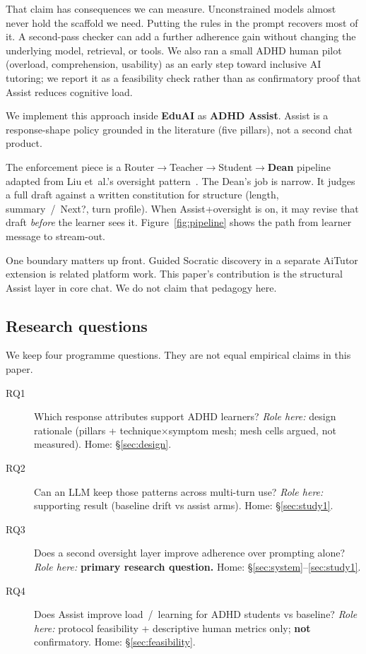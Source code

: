 That claim has consequences we can measure. Unconstrained models almost never
hold the scaffold we need. Putting the rules in the prompt recovers most of
it. A second-pass checker can add a further adherence gain without changing
the underlying model, retrieval, or tools. We also ran a small ADHD human
pilot (overload, comprehension, usability) as an early step toward inclusive
AI tutoring; we report it as a feasibility check rather than as confirmatory
proof that Assist reduces cognitive load.

We implement this approach inside \textbf{EduAI} as \textbf{ADHD Assist}.
Assist is a response-shape policy grounded in the literature (five pillars),
not a second chat product.

The enforcement piece is a Router$\to$Teacher$\to$Student$\to$\textbf{Dean}
pipeline adapted from Liu et~al.'s oversight
pattern~\cite{liu2024socraticlm}. The Dean's job is narrow. It judges a full
draft against a written constitution for structure (length, summary~/~Next?,
turn profile). When Assist+oversight is on, it may revise that draft
\emph{before} the learner sees it. Figure~\ref{fig:pipeline} shows the path
from learner message to stream-out.

One boundary matters up front. Guided Socratic discovery in a separate AiTutor
extension is related platform work. This paper's contribution is the
structural Assist layer in core chat. We do not claim that pedagogy here.

\subsection{Research questions}
\label{sec:rqs}

We keep four programme questions. They are not equal empirical claims in this
paper.

\begin{description}
  \item[RQ1] Which response attributes support ADHD learners?
    \emph{Role here:} design rationale (pillars + technique$\times$symptom
    mesh; mesh cells argued, not measured). Home: \S\ref{sec:design}.
  \item[RQ2] Can an LLM keep those patterns across multi-turn use?
    \emph{Role here:} supporting result (baseline drift vs assist arms).
    Home: \S\ref{sec:study1}.
  \item[RQ3] Does a second oversight layer improve adherence over prompting
    alone? \emph{Role here:} \textbf{primary research question.}
    Home: \S\ref{sec:system}--\ref{sec:study1}.
  \item[RQ4] Does Assist improve load~/~learning for ADHD students vs
    baseline? \emph{Role here:} protocol feasibility + descriptive human
    metrics only; \textbf{not} confirmatory. Home: \S\ref{sec:feasibility}.
\end{description}

